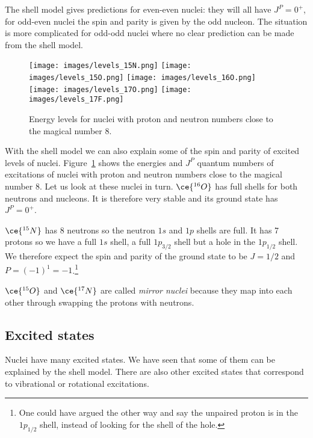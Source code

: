 \documentclass[12pt]{article}
\begin{document}
The shell model gives predictions for even-even nuclei: they will all have $J^P=0^+$, for odd-even nuclei the spin and parity is given by the odd nucleon. The situation is more complicated for odd-odd nuclei where no clear prediction can be made from the shell model.  
\begin{figure}
\begin{center}
\texttt{[image: images/levels\_15N.png]}
\texttt{[image: images/levels\_15O.png]}
\texttt{[image: images/levels\_16O.png]}
\texttt{[image: images/levels\_17O.png]}
\texttt{[image: images/levels\_17F.png]}
\caption{Energy levels for nuclei with proton and neutron numbers close to the magical number 8.}\label{fig:levelsNOOOF}
\end{center}
\end{figure}

With the shell model we can also explain some of the spin and parity of excited levels of nuclei. Figure~\ref{fig:levelsNOOOF} shows the energies and $J^P$ quantum numbers of excitations of nuclei with proton and neutron numbers close to the magical number $8$. Let us look at these nuclei in turn. $\ce{^{16}O}$ has full shells for both neutrons and nucleons. It is therefore very stable and its ground state has $J^P=0^+$.

$\ce{^{15}N}$ has 8 neutrons so the neutron $1s$ and $1p$ shells are full. It has 7 protons so we have a full $1s$ shell, a full $1p_{3/2}$ shell but a hole in the $1p_{1/2}$ shell. We therefore expect the spin and parity of the ground state to be $J=1/2$ and $P=(-1)^1=-1$.\footnote{One could have argued the other way and say the unpaired proton is in the $1p_{1/2}$ shell, instead of looking for the shell of the hole.}

$\ce{^{15}O}$ and $\ce{^{17}N}$ are called \emph{mirror nuclei} because they map into each other through swapping the protons with neutrons.
%
%
%
\subsection{Excited states}
%
%
%
Nuclei have many excited states. We have seen that some of them can be explained by the shell model. There are also other excited states that correspond to vibrational or rotational excitations. 
\end{document}
